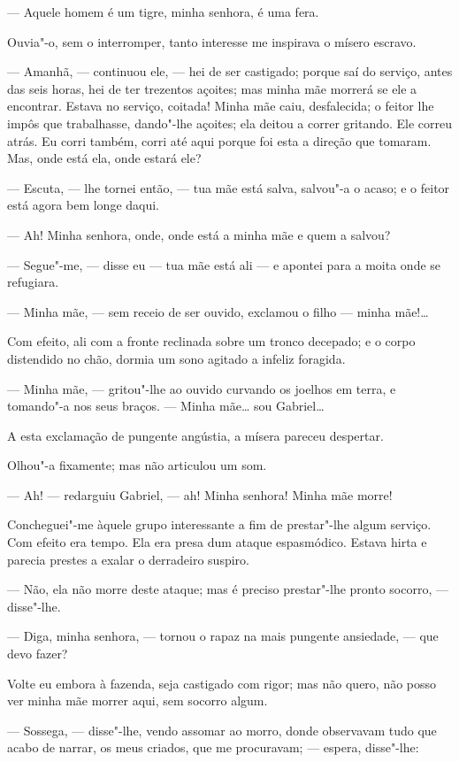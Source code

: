 --- Aquele homem é um tigre, minha senhora, é uma fera.

Ouvia"-o, sem o interromper, tanto interesse me inspirava o mísero
escravo.

--- Amanhã, --- continuou ele, --- hei de ser castigado; porque saí do
serviço, antes das seis horas, hei de ter trezentos açoites; mas minha
mãe morrerá se ele a encontrar. Estava no serviço, coitada! Minha mãe
caiu, desfalecida; o feitor lhe impôs que trabalhasse, dando"-lhe
açoites; ela deitou a correr gritando. Ele correu atrás. Eu corri
também, corri até aqui porque foi esta a direção que tomaram. Mas, onde
está ela, onde estará ele?

--- Escuta, --- lhe tornei então, --- tua mãe está salva, salvou"-a o
acaso; e o feitor está agora bem longe daqui.

--- Ah! Minha senhora, onde, onde está a minha mãe e quem a salvou?

--- Segue"-me, --- disse eu --- tua mãe está ali --- e apontei para a moita
onde se refugiara.

--- Minha mãe, --- sem receio de ser ouvido, exclamou o filho --- minha
mãe!\ldots{}

Com efeito, ali com a fronte reclinada sobre um tronco decepado; e o
corpo distendido no chão, dormia um sono agitado a infeliz foragida.

--- Minha mãe, --- gritou"-lhe ao ouvido curvando os joelhos em terra, e
tomando"-a nos seus braços. --- Minha mãe\ldots{} sou Gabriel\ldots{}

A esta exclamação de pungente angústia, a mísera pareceu despertar.

Olhou"-a fixamente; mas não articulou um som.

--- Ah! --- redarguiu Gabriel, --- ah! Minha senhora! Minha mãe morre!

Concheguei"-me àquele grupo interessante a fim de prestar"-lhe algum
serviço. Com efeito era tempo. Ela era presa dum ataque espasmódico.
Estava hirta e parecia prestes a exalar o derradeiro suspiro.

--- Não, ela não morre deste ataque; mas é preciso prestar"-lhe pronto
socorro, --- disse"-lhe.

--- Diga, minha senhora, --- tornou o rapaz na mais pungente ansiedade,
--- que devo fazer?

Volte eu embora à fazenda, seja castigado com rigor; mas não quero, não
posso ver minha mãe morrer aqui, sem socorro algum.

--- Sossega, --- disse"-lhe, vendo assomar ao morro, donde observavam tudo
que acabo de narrar, os meus criados, que me procuravam; --- espera,
disse"-lhe:

